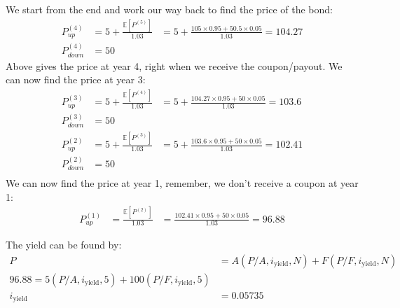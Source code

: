 \begin{example}
    We start from the end and work our way back to find the price of the bond:
    \begin{align*}
        P_{up}^{(4)}   & = 5 + \frac{\mathbb{E}[P^{(5)}]}{1.03} & = 5 + \frac{105\times0.95 + 50.5\times0.05}{1.03} = 104.27 \\
        P_{down}^{(4)} & = 50
    \end{align*}
    Above gives the price at year 4, right when we receive the coupon/payout. We can now find the price at year 3:
    \begin{align}
        P_{up}^{(3)}   & = 5 + \frac{\mathbb{E}[P^{(4)}]}{1.03} & = 5 + \frac{104.27\times0.95 + 50\times0.05}{1.03} = 103.6 \\
        P_{down}^{(3)} & = 50                                                                                                \\
        P_{up}^{(2)}   & = 5 + \frac{\mathbb{E}[P^{(3)}]}{1.03} & = 5 + \frac{103.6\times0.95 + 50\times0.05}{1.03} = 102.41 \\
        P_{down}^{(2)} & = 50                                                                                                \\
    \end{align}
    We can now find the price at year 1, remember, we don't receive a coupon at year 1:
    \begin{align*}
        P_{up}^{(1)} & = \frac{\mathbb{E}[P^{(2)}]}{1.03} & = \frac{102.41\times0.95 + 50\times0.05}{1.03} = 96.88
    \end{align*}

    The yield can be found by:
    \begin{align*}
        P                & = A(P/A, i_{\text{yield}}, N) + F(P/F, i_{\text{yield}}, N) \\
        96.88 = 5(P/A, i_{\text{yield}}, 5) + 100(P/F, i_{\text{yield}}, 5)            \\
        i_{\text{yield}} & = 0.05735
    \end{align*}
\end{example}